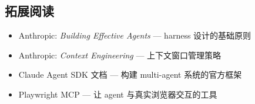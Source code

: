 \subsection{拓展阅读}

\begin{itemize}
    \item Anthropic: \textit{Building Effective Agents} — harness 设计的基础原则
    \item Anthropic: \textit{Context Engineering} — 上下文窗口管理策略
    \item Claude Agent SDK 文档 — 构建 multi-agent 系统的官方框架
    \item Playwright MCP — 让 agent 与真实浏览器交互的工具
\end{itemize}



